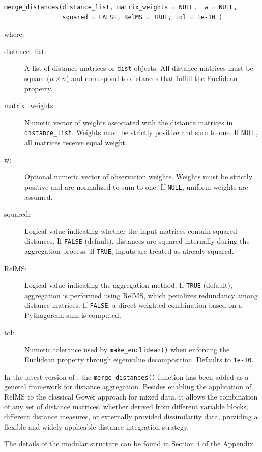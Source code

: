 \begin{verbatim} 
merge_distances(distance_list, matrix_weights = NULL,  w = NULL,
                squared = FALSE, RelMS = TRUE, tol = 1e-10 ) 
\end{verbatim} 
where: 
\begin{description}
\item[distance\_list:] A list of distance matrices or \texttt{dist} objects. All distance matrices must be square (\(n \times n\)) and correspond to distances that fulfill the Euclidean property. 
\item[matrix\_weights:] Numeric vector of weights associated with the distance matrices in \texttt{distance\_list}. Weights must be strictly positive and sum to one. If \texttt{NULL}, all matrices receive equal weight. 
\item[w:] Optional numeric vector of observation weights. Weights must be strictly positive and are normalized to sum to one. If \texttt{NULL}, uniform weights are assumed. 
\item[squared:] Logical value indicating whether the input matrices contain squared distances. If \texttt{FALSE} (default), distances are squared internally during the aggregation process. If \texttt{TRUE}, inputs are treated as already squared. 
\item[RelMS:] Logical value indicating the aggregation method. If \texttt{TRUE} (default), aggregation is performed using RelMS, which penalizes redundancy among distance matrices. If \texttt{FALSE}, a direct weighted combination based on a Pythagorean sum is computed. 
\item[tol:] Numeric tolerance used by \texttt{make\_euclidean()} when enforcing the Euclidean property through eigenvalue decomposition. Defaults to \texttt{1e-10}. 
\end{description}

In the latest version of , the \texttt{merge\_distances()} function has been added as a general framework for distance aggregation. Besides enabling the application of RelMS to the classical Gower approach for mixed data, it allows the combination of any set of distance matrices, whether derived from different variable blocks, different distance measures, or externally provided dissimilarity data, providing a flexible and widely applicable distance integration strategy.

The details of the modular structure can be found in Section 4 
of the Appendix.

